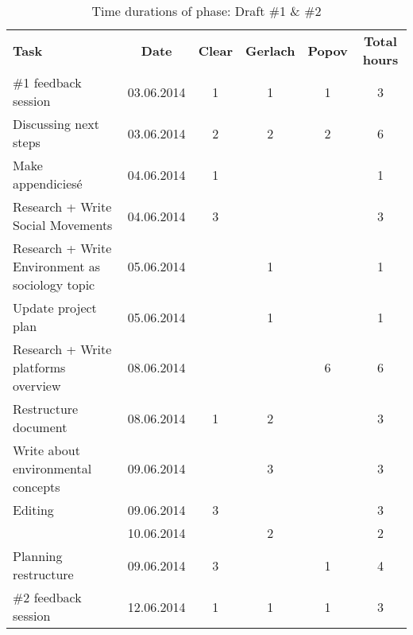 \begin{table}[H]
\renewcommand{\arraystretch}{1.6}
\begin{threeparttable}

  \caption{Time durations of phase: Draft \#1 \& \#2}
  
  \begin{tabular}{p{3cm} c|c c c| c}
      \textbf{Task} & \textbf{Date}& \textbf{Clear} & \textbf{Gerlach} & \textbf{Popov} & \textbf{Total hours} \\
        \#1 feedback session
        				& 03.06.2014 &	1	&  1		&	1	& 3 \\
        Discussing next steps
        				& 03.06.2014 &	2	&  2		& 	2	& 6 \\
        Make appendicies\'{e}
        				& 04.06.2014 & 1	& 			& 		& 1 \\
        Research + Write Social Movements  
        				& 04.06.2014 & 3	& 			& 		& 3 \\                         Research + Write Environment as sociology topic
                        & 05.06.2014 & 		&  1		&		& 1 \\	
        Update project plan
                        & 05.06.2014 &		&  1		&		& 1 \\
        Research + Write platforms overview  
        				& 08.06.2014 & 	& 			& 	6	& 6 \\                        
        Restructure document
        				& 08.06.2014 & 1	&	2	   &		& 3 \\
        Write about environmental concepts
        				& 09.06.2014  &	&	3		&		&  3 \\
        Editing
        				& 09.06.2014  & 3	&			&		&  3 \\
                        & 10.06.2014  &		 &	2		&		&  2 \\
        Planning restructure
        				& 09.06.2014  & 3	&			&	1	&  4 \\
        \#2 feedback session
        				& 12.06.2014 &	1	&  1		&	1	& 3 \\
        

  \end{tabular}

\end{threeparttable}

\end{table}

